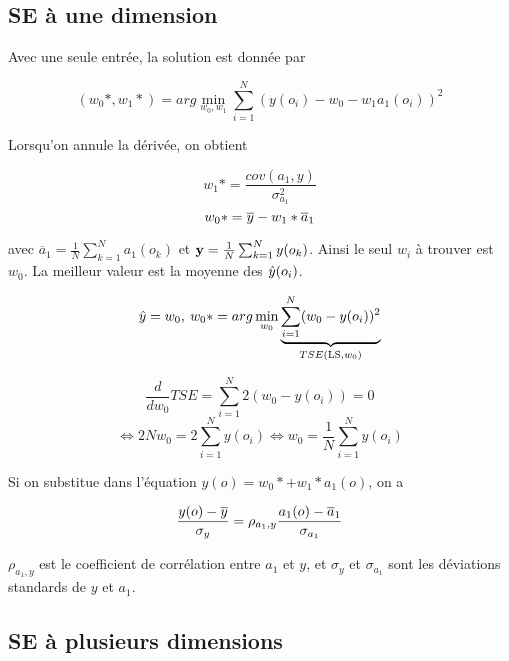 		\subsection{SE à une dimension}
		
		Avec une seule entrée, la solution est donnée par
		
		$$(w_0*, w_1*) = arg \min_{w_0, w_1} \sum_{i = 1}^N (y(o_i) - w_0 - w_1a_1(o_i))^2$$
		
		Lorsqu'on annule la dérivée, on obtient
		
		$$w_1* = \frac{cov(a_1, y)}{\sigma^2_{a_1}}$$
		$$w_0* = \overline{y} - w_1*\overline{a}_1$$
		
		avec $\overline{a}_1 = \frac{1}{N} \sum_{k = 1}^Na_1(o_k)$ et $\textbf{y} = \frac{1}{N} \sum_{k = 1}^N y(o_k)$. Ainsi le seul $w_i$ à trouver est $w_0$. La meilleur valeur est la moyenne des $\hat{y}(o_i)$.
		
		$$\hat{y} = w_0, \: w_0* = arg \min_{w_0} \underbrace{\sum_{i = 1}^N (w_0 - y(o_i))^2}_{TSE(\text{LS}, w_0)}$$
		
		$$\frac{d}{dw_0} TSE = \sum_{i = 1}^N 2(w_0 - y(o_i)) = 0$$
		$$\Leftrightarrow 2 N w_0 = 2 \sum_{i = 1}^N y(o_i) \Leftrightarrow w_0 = \frac{1}{N} \sum_{i = 1}^N y(o_i)$$
		
		Si on substitue dans l'équation $y(o) = w_0* + w_1*a_1(o)$, on a
		
		$$\frac{y(o) - \overline{y}}{\sigma_y} = \rho_{a_1, y} \frac{a_1(o) - \overline{a}_1}{\sigma_{a_1}}$$
		
		$\rho_{a_1, y}$ est le coefficient de corrélation entre $a_1$ et $y$, et $\sigma_y$ et $\sigma_{a_1}$ sont les déviations standards de $y$ et $a_1$.
		
		\subsection{SE à plusieurs dimensions}
